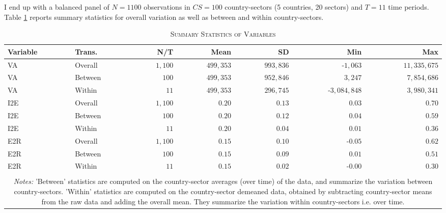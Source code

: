 \documentclass[a4paper]{article}
\begin{document}
I end up with a balanced panel of $N = 1100$ observations in $CS = 100$ country-sectors (5 countries, 20 sectors) and $T = 11$ time periods. Table \ref{tab:SUMM_GROWTH} reports summary statistics for overall variation as well as between and within country-sectors. %

\begin{table}[h!] \centering 
  \caption{\label{tab:SUMM_GROWTH}\textsc{Summary Statistics of Variables}}
  \begin{center}
\begin{tabular}{ llrrrrr} \toprule
Variable & Trans. & N/T & Mean & SD & Min & Max \\ \midrule
VA & Overall & $1,100$ & $499,353$ & $993,836$ & -$1,063$ & $11,335,675$ \\ 
VA & Between & $100$ & $499,353$ & $952,846$ & $3,247$ & $7,854,686$ \\ 
VA & Within & $11$ & $499,353$ & $296,745$ & -$3,084,848$ & $3,980,341$ \\ 
I2E & Overall & $1,100$ & $0.20$ & $0.13$ & $0.03$ & $0.70$ \\ 
I2E & Between & $100$ & $0.20$ & $0.12$ & $0.04$ & $0.59$ \\ 
I2E & Within & $11$ & $0.20$ & $0.04$ & $0.01$ & $0.36$ \\ 
E2R & Overall & $1,100$ & $0.15$ & $0.10$ & -$0.05$ & $0.62$ \\ 
E2R & Between & $100$ & $0.15$ & $0.09$ & $0.01$ & $0.51$ \\ 
E2R & Within & $11$ & $0.15$ & $0.02$ & -$0.00$ & $0.30$ \\ \bottomrule
\\ [-0.9em]
\multicolumn{7}{c}{\parbox{0.8\textwidth}{\scriptsize
\textit{Notes:} 'Between' statistics are computed on the country-sector averages (over time) of the data, and summarize the variation between country-sectors. 'Within' statistics are computed on the country-sector demeaned data, obtained by subtracting country-sector means from the raw data and adding the overall mean. They summarize the variation within country-sectors i.e. over time.}}
\end{tabular} 
 \end{center}
\end{table} 
\FloatBarrier 
\end{document}
